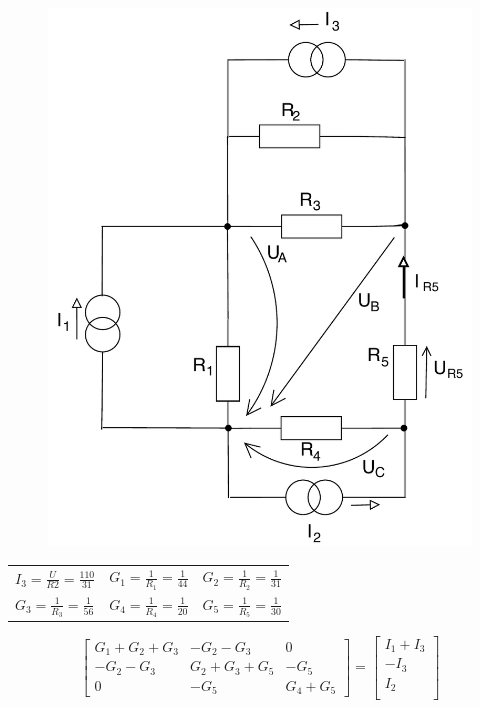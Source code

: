 \documentclass[12pt,a4paper]{article}
\begin{document}
\begin{minipage}{\linewidth}
\begin{minipage}{0.45\linewidth}
\begin{figure}[H]
              \includegraphics[width=\linewidth]{Circuits/3-B.pdf}
          \end{figure}
      \end{minipage}
  \end{minipage}
  
  \begin{tabular}{ l l l }
  	$I_3 = \frac{U}{R2} = \frac{110}{31}$ & $G_1 = \frac{1}{R_1} = \frac{1}{44}$ & $G_2 = \frac{1}{R_2} = \frac{1}{31}$ \\
  	 $G_3 = \frac{1}{R_3} = \frac{1}{56}$ & $G_4 = \frac{1}{R_4} = \frac{1}{20}$ & $G_5 = \frac{1}{R_5} = \frac{1}{30}$ \\
  \end{tabular}
  
  \vspace{1cm}
  
\[
\begin{bmatrix}
    G_1 + G_2 + G_3       & -G_2 - G_3 & 0 \\
    -G_2 - G_3       & G_2 + G_3 + G_5 & -G_5  \\
    0      & -G_5 & G_4 + G_5
\end{bmatrix}
=
\begin{bmatrix}
    I_1 + I_3 \\
    -I_3 \\
    I_2 \\
\end{bmatrix}
\]
\end{document}
